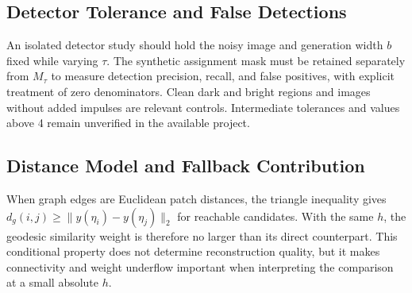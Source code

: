 \documentclass[pdflatex,iicol,sn-mathphys-num]{sn-jnl}
\newif\ifshowportuguese
\newcommand{\pt}[1]{\ifshowportuguese\par\begingroup\small\color{blue!55!black}\noindent\textbf{PT: }#1\par\endgroup\fi}
\begin{document}
\subsection{Detector Tolerance and False Detections}
\label{subsec:tau_sensitivity}

An isolated detector study should hold the noisy image and generation width $b$ fixed while varying $\tau$. The synthetic assignment mask must be retained separately from $M_\tau$ to measure detection precision, recall, and false positives, with explicit treatment of zero denominators. Clean dark and bright regions and images without added impulses are relevant controls. Intermediate tolerances and values above 4 remain unverified in the available project.
\pt{Um estudo isolado do detector deve manter fixas a imagem ruidosa e a largura de geração $b$ enquanto varia $\tau$. A máscara de atribuições sintéticas deve ser preservada separadamente de $M_\tau$ para medir precisão, revocação e falsos positivos, com tratamento explícito de denominadores nulos. Regiões limpas escuras e claras e imagens sem impulsos adicionados são controles relevantes. Tolerâncias intermediárias e valores acima de 4 continuam não verificadas no projeto disponível.}

\subsection{Distance Model and Fallback Contribution}
\label{subsec:ianlm_vs_ghnlm}

When graph edges are Euclidean patch distances, the triangle inequality gives $d_g(i,j)\geq\|y(\eta_i)-y(\eta_j)\|_2$ for reachable candidates. With the same $h$, the geodesic similarity weight is therefore no larger than its direct counterpart. This conditional property does not determine reconstruction quality, but it makes connectivity and weight underflow important when interpreting the comparison at a small absolute $h$.
\pt{Quando as arestas do grafo são distâncias Euclidianas entre patches, a desigualdade triangular fornece $d_g(i,j)\geq\|y(\eta_i)-y(\eta_j)\|_2$ para candidatos alcançáveis. Com o mesmo $h$, o peso de similaridade geodésica não é, portanto, maior que seu correspondente direto. Essa propriedade condicional não determina a qualidade da reconstrução, mas torna a conectividade e o underflow dos pesos importantes na interpretação da comparação com $h$ absoluto pequeno.}
\end{document}
